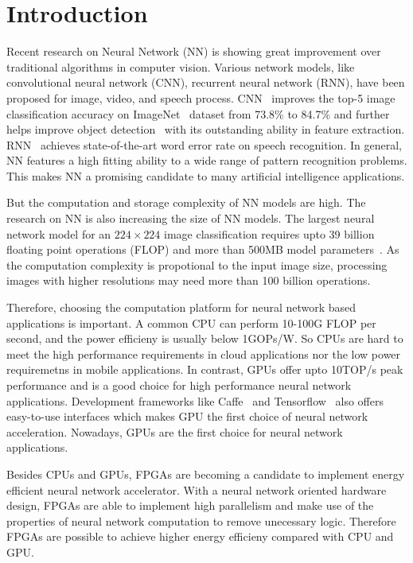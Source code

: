 \section{Introduction}\label{sec:introduction}

Recent research on Neural Network (NN) is showing great improvement over traditional algorithms in computer vision. Various network models, like convolutional neural network (CNN), recurrent neural network (RNN), have been proposed for image, video, and speech process. CNN~\cite{krizhevsky2012imagenet} improves the top-5 image classification accuracy on ImageNet~\cite{ILSVRC15} dataset from 73.8\% to 84.7\% and further helps improve object detection~\cite{girshick2014rich} with its outstanding ability in feature extraction. RNN~\cite{hannun2014deep} achieves state-of-the-art word error rate on speech recognition. In general, NN features a high fitting ability to a wide range of pattern recognition problems. This makes NN a promising candidate to many artificial intelligence applications.

But the computation and storage complexity of NN models are high. The research on NN is also increasing the size of NN models. The largest neural network model for an $224\times224$ image classification requires upto 39 billion floating point operations (FLOP) and more than 500MB model parameters~\cite{simonyan2014very}. As the computation complexity is propotional to the input image size, processing images with higher resolutions may need more than 100 billion operations.

Therefore, choosing the computation platform for neural network based applications is important. A common CPU can perform 10-100G FLOP per second, and the power efficieny is usually below 1GOPs/W. So CPUs are hard to meet the high performance requirements in cloud applications nor the low power requiremetns in mobile applications. In contrast, GPUs offer upto 10TOP/s peak performance and is a good choice for high performance neural network applications. Development frameworks like Caffe~\cite{jia2014caffe} and Tensorflow~\cite{abadi2016tensorflow} also offers easy-to-use interfaces which makes GPU the first choice of neural network acceleration. Nowadays, GPUs are the first choice for neural network applications.

Besides CPUs and GPUs, FPGAs are becoming a candidate to implement energy efficient neural network accelerator. With a neural network oriented hardware design, FPGAs are able to implement high parallelism and make use of the properties of neural network computation to remove unecessary logic. Therefore FPGAs are possible to achieve higher energy efficieny compared with CPU and GPU. 


